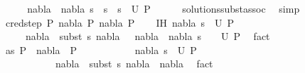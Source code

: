 \begin{isabellebody}
\ \ \isamarkupfalse%
\ \isamarkupfalse%
\ {\isachardoublequoteopen}{\isacharparenleft}{\kern0pt}nabla{}\ {\isasymunion}\ nabla{}{\isacharcomma}{\kern0pt}\ s{}\ {\isasymbullet}\ {\isacharparenleft}{\kern0pt}s{}\ {\isasymbullet}\ s{\isacharparenright}{\kern0pt}{\isacharparenright}{\kern0pt}\ {\isasymin}\ U\ P{}{\isachardoublequoteclose}\isanewline
\ \ \ \ \isamarkupfalse%
\ solutions{\isacharunderscore}{\kern0pt}subst{\isacharunderscore}{\kern0pt}assoc\ \isamarkupfalse%
\ simp\isanewline
{}\isamarkupfalse%
\isanewline
\ \ \isamarkupfalse%
\ {\isacharparenleft}{\kern0pt}cred{\isacharunderscore}{\kern0pt}step\ P{}\ nabla\ P{}\ nabla{}\ P{}{\isacharparenright}{\kern0pt}\isanewline
\ \ \isamarkupfalse%
\ IH{\isacharcolon}{\kern0pt}\ {\isachardoublequoteopen}{\isacharparenleft}{\kern0pt}nabla{}{\isacharcomma}{\kern0pt}\ s{}{\isacharparenright}{\kern0pt}\ {\isasymin}\ U\ P{}\ {\isasymLongrightarrow}\isanewline
\ \ \ \ \ nabla{}\ {\isasymTurnstile}\ {\isacharparenleft}{\kern0pt}subst\ s{}{\isacharparenright}{\kern0pt}\ nabla{}\ \ {\isasymLongrightarrow}\ {\isacharparenleft}{\kern0pt}nabla{}\ {\isasymunion}\ nabla{}{\isacharcomma}{\kern0pt}\ s{}\ {\isasymbullet}\ {\isacharbrackleft}{\kern0pt}{\isacharbrackright}{\kern0pt}{\isacharparenright}{\kern0pt}\ {\isasymin}\ U\ P{}{\isachardoublequoteclose}\ \isamarkupfalse%
\ fact\isanewline
\ \ \isamarkupfalse%
\ as{\isacharcolon}{\kern0pt}\ {\isachardoublequoteopen}P{}\ {\isasymturnstile}\ nabla\ {\isasymrightarrow}\ P{}{\isachardoublequoteclose}\isanewline
\ \ \ \ \ \ \ \ \ \ \ {\isachardoublequoteopen}{\isacharparenleft}{\kern0pt}nabla{}{\isacharcomma}{\kern0pt}\ s{}{\isacharparenright}{\kern0pt}\ {\isasymin}\ U\ P{}{\isachardoublequoteclose}\isanewline
\ \ \ \ \ \ \ \ \ \ \ {\isachardoublequoteopen}nabla{}\ {\isasymTurnstile}\ {\isacharparenleft}{\kern0pt}subst\ s{}{\isacharparenright}{\kern0pt}\ {\isacharparenleft}{\kern0pt}nabla{}\ {\isasymunion}\ nabla{\isacharparenright}{\kern0pt}{\isachardoublequoteclose}\ \isamarkupfalse%
\ fact{\isacharplus}{\kern0pt}\isanewline
\ \ \isamarkupfalse%

\end{isabellebody}
